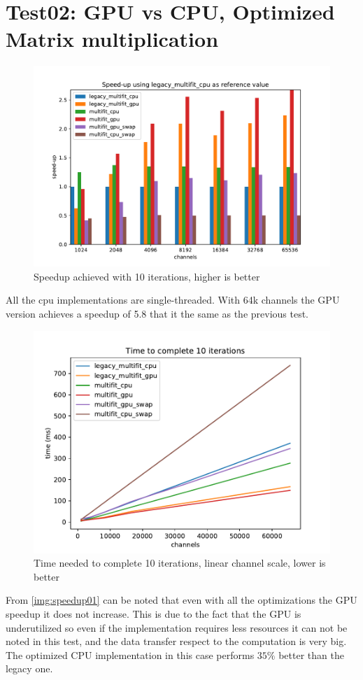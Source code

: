 \section{Test02: GPU vs CPU, Optimized Matrix multiplication}

\begin{figure}[h]
  \includegraphics[width=\textwidth]{img/speedup02}
  \caption{Speedup achieved with 10 iterations, higher is better}
  \label{img:speedup02}
\end{figure}
All the cpu implementations are single-threaded. With 64k channels the GPU version achieves a speedup of 5.8 that it the same as the previous test.
\begin{figure}[H]
  \includegraphics[width=.75\textwidth]{img/linscale02}
  \caption{Time needed to complete 10 iterations, linear channel scale, lower is better}
  \label{img:linscale02}
\end{figure}
From \ref{img:speedup01} can be noted that even with all the optimizations the GPU speedup it does not increase. This is due to the fact that the GPU is underutilized so even if the implementation requires less resources it can not be noted in this test, and the data transfer respect to the computation is very big. The optimized CPU implementation in this case performs $35\%$ better than the legacy one.
